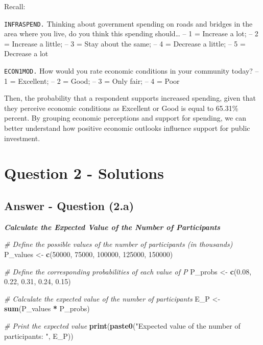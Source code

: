 \documentclass[
  11pt,
]{article}
\newenvironment{Shaded}{\begin{snugshade}}{\end{snugshade}}
\newcommand{\CommentTok}[1]{\textcolor[rgb]{0.56,0.35,0.01}{\textit{#1}}}
\newcommand{\DecValTok}[1]{\textcolor[rgb]{0.00,0.00,0.81}{#1}}
\newcommand{\FloatTok}[1]{\textcolor[rgb]{0.00,0.00,0.81}{#1}}
\newcommand{\FunctionTok}[1]{\textcolor[rgb]{0.13,0.29,0.53}{\textbf{#1}}}
\newcommand{\NormalTok}[1]{#1}
\newcommand{\OtherTok}[1]{\textcolor[rgb]{0.56,0.35,0.01}{#1}}
\newcommand{\SpecialCharTok}[1]{\textcolor[rgb]{0.81,0.36,0.00}{\textbf{#1}}}
\newcommand{\StringTok}[1]{\textcolor[rgb]{0.31,0.60,0.02}{#1}}
\begin{document}
Recall:

\texttt{INFRASPEND.} Thinking about government spending on roads and
bridges in the area where you live, do you think this spending
should\ldots{} -- 1 = Increase a lot; -- 2 = Increase a little; -- 3 =
Stay about the same; -- 4 = Decrease a little; -- 5 = Decrease a lot

\texttt{ECON1MOD.} How would you rate economic conditions in your
community today? -- 1 = Excellent; -- 2 = Good; -- 3 = Only fair; -- 4 =
Poor

Then, the probability that a respondent supports increased spending,
given that they perceive economic conditions as Excellent or Good is
equal to 65.31\% percent. By grouping economic perceptions and support
for spending, we can better understand how positive economic outlooks
influence support for public investment.

\section{Question 2 - Solutions}\label{question-2---solutions}

\subsection{Answer - Question (2.a)}\label{answer---question-2.a}

\textbf{\emph{Calculate the Expected Value of the Number of
Participants}}

\begin{Shaded}
\begin{Highlighting}[]
\CommentTok{\# Define the possible values of the number of participants (in thousands)}
\NormalTok{P\_values }\OtherTok{\textless{}{-}} \FunctionTok{c}\NormalTok{(}\DecValTok{50000}\NormalTok{, }\DecValTok{75000}\NormalTok{, }\DecValTok{100000}\NormalTok{, }\DecValTok{125000}\NormalTok{, }\DecValTok{150000}\NormalTok{)}

\CommentTok{\# Define the corresponding probabilities of each value of P}
\NormalTok{P\_probs }\OtherTok{\textless{}{-}} \FunctionTok{c}\NormalTok{(}\FloatTok{0.08}\NormalTok{, }\FloatTok{0.22}\NormalTok{, }\FloatTok{0.31}\NormalTok{, }\FloatTok{0.24}\NormalTok{, }\FloatTok{0.15}\NormalTok{)}

\CommentTok{\# Calculate the expected value of the number of participants}
\NormalTok{E\_P }\OtherTok{\textless{}{-}} \FunctionTok{sum}\NormalTok{(P\_values }\SpecialCharTok{*}\NormalTok{ P\_probs)}

\CommentTok{\# Print the expected value}
\FunctionTok{print}\NormalTok{(}\FunctionTok{paste0}\NormalTok{(}\StringTok{"Expected value of the number of participants: "}\NormalTok{, E\_P))}
\end{Highlighting}
\end{Shaded}
\end{document}
